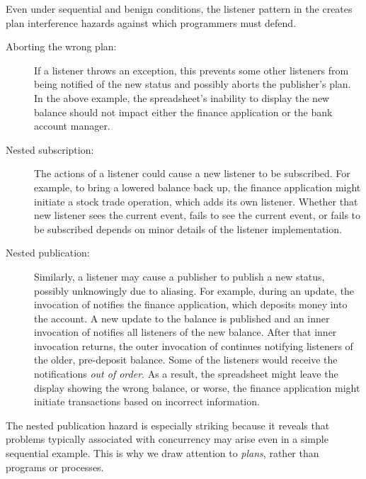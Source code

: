 \documentclass{llncs}
\begin{document}

Even under sequential and benign conditions, the listener pattern in
the  creates plan interference hazards against
which programmers must defend.
%
\begin{description}

\item[Aborting the wrong plan:] 

If a listener throws an exception, this prevents some other listeners
from being notified of the new status and possibly aborts the
publisher's plan. In the above example, the spreadsheet's inability to
display the new balance should not impact either the finance
application or the bank account manager.

\item[Nested subscription:] 

The actions of a listener could cause a new listener to be subscribed.
For example, to bring a lowered balance back up, the finance
application might initiate a stock trade operation, which adds its own
listener.  Whether that new listener sees the current event, fails to
see the current event, or fails to be subscribed depends on minor
details of the listener implementation.

\item[Nested publication:] 

Similarly, a listener may cause a publisher to publish a new status,
possibly unknowingly due to aliasing.  For example, during an update,
the invocation of  notifies the finance application, which
deposits money into the account. A new update to the balance is
published and an inner invocation of  notifies all listeners
of the new balance.  After that inner invocation returns, the outer
invocation of  continues notifying listeners of the older,
pre-deposit balance.  Some of the listeners would receive the
notifications \emph{out of order}.  As a result, the spreadsheet might
leave the display showing the wrong balance, or worse, the finance
application might initiate transactions based on incorrect
information.

\end{description}
%
The nested publication hazard is especially striking because it
reveals that problems typically associated with concurrency may arise
even in a simple sequential example. This is why we draw attention to
\emph{plans}, rather than programs or processes.
\end{document}
